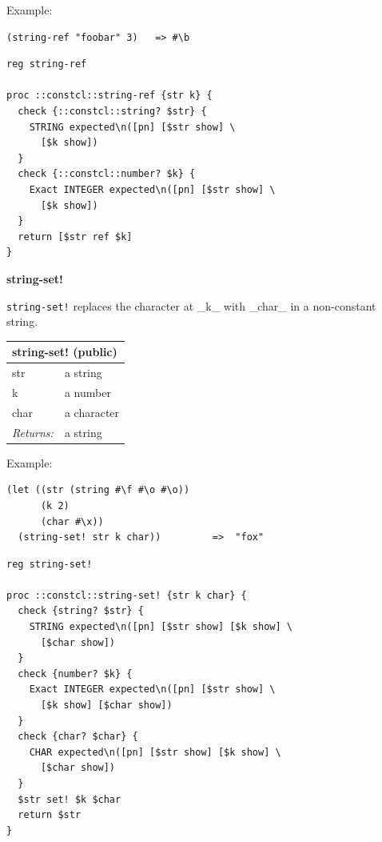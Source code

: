 \documentclass[twoside,9pt]{report}
\begin{document}
Example:

\noindent\makebox[\linewidth]{\rule{\linewidth}{0.4pt}}
\begin{lstlisting}
(string-ref "foobar" 3)   => #\b
\end{lstlisting}
\noindent\makebox[\linewidth]{\rule{\linewidth}{0.4pt}}
\noindent\makebox[\linewidth]{\rule{\linewidth}{0.4pt}}
\begin{lstlisting}
reg string-ref
 
proc ::constcl::string-ref {str k} {
  check {::constcl::string? $str} {
    STRING expected\n([pn] [$str show] \
      [$k show])
  }
  check {::constcl::number? $k} {
    Exact INTEGER expected\n([pn] [$str show] \
      [$k show])
  }
  return [$str ref $k]
}
\end{lstlisting}
\noindent\makebox[\linewidth]{\rule{\linewidth}{0.4pt}}

\textbf{string-set!}


\texttt{string-set!} replaces the character at \_k\_ with \_char\_ in a non-constant string.

\begin{tabular}{ |l l| }
\hline
\multicolumn{2}{|l|}{string-set! (public)} \\
\hline
str & a string \\
k & a number \\
char & a character \\
\textit{Returns:} & a string \\
\hline
\end{tabular}


Example:

\noindent\makebox[\linewidth]{\rule{\linewidth}{0.4pt}}
\begin{lstlisting}
(let ((str (string #\f #\o #\o))
      (k 2)
      (char #\x))
  (string-set! str k char))         =>  "fox"
\end{lstlisting}
\noindent\makebox[\linewidth]{\rule{\linewidth}{0.4pt}}
\noindent\makebox[\linewidth]{\rule{\linewidth}{0.4pt}}
\begin{lstlisting}
reg string-set!
 
proc ::constcl::string-set! {str k char} {
  check {string? $str} {
    STRING expected\n([pn] [$str show] [$k show] \
      [$char show])
  }
  check {number? $k} {
    Exact INTEGER expected\n([pn] [$str show] \
      [$k show] [$char show])
  }
  check {char? $char} {
    CHAR expected\n([pn] [$str show] [$k show] \
      [$char show])
  }
  $str set! $k $char
  return $str
}
\end{lstlisting}
\noindent\makebox[\linewidth]{\rule{\linewidth}{0.4pt}}
\end{document}
